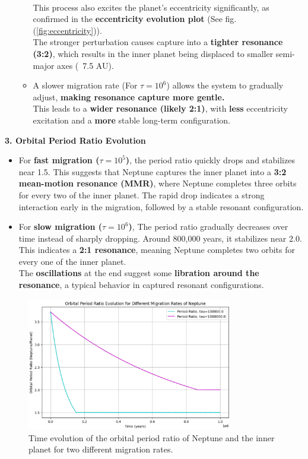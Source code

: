 \documentclass[12pt,a4paper]{article}
\begin{document}
\begin{enumerate}
\begin{itemize}
      \\ This process also excites the planet’s eccentricity significantly, as confirmed in the \textbf{eccentricity evolution plot} (See fig.(\ref{fig:eccentricity})).
      \\ The stronger perturbation causes capture into a \textbf{tighter resonance (3:2)}, which results in the inner planet being displaced to smaller semi-major axes (~7.5 AU).
      \item A slower migration rate (For \(\tau = 10^6\)) allows the system to gradually adjust, \textbf{making resonance capture more gentle.}
      \\ This leads to a \textbf{wider resonance (likely 2:1)}, with \textbf{less} eccentricity excitation and a \textbf{more} stable long-term configuration.
    \end{itemize}
\end{enumerate}

\textbf{3. Orbital Period Ratio Evolution}
\begin{itemize}
    \item For \textbf{fast migration (\(\tau = 10^5\))}, the period ratio quickly drops and stabilizes near 1.5. This suggests that Neptune captures the inner planet into a \textbf{3:2 mean-motion resonance (MMR)}, where Neptune completes three orbits for every two of the inner planet. The rapid drop indicates a strong interaction early in the migration, followed by a stable resonant configuration.
    \item For \textbf{slow migration (\(\tau = 10^6\))}, The period ratio gradually decreases over time instead of sharply dropping. Around 800,000 years, it stabilizes near 2.0.
    \\ This indicates a \textbf{2:1 resonance}, meaning Neptune completes two orbits for every one of the inner planet.
    \\ The \textbf{oscillations} at the end suggest some \textbf{libration around the resonance}, a typical behavior in captured resonant configurations.
\end{itemize}
\begin{figure}[h]
  \centering
  \includegraphics[width=0.8\textwidth]{ExpoMig/Period_Evo.png}
  \caption{Time evolution of the orbital period ratio of Neptune and the inner planet for two different migration rates.}
  \label{fig:period_ratio}
\end{figure}
\end{document}
